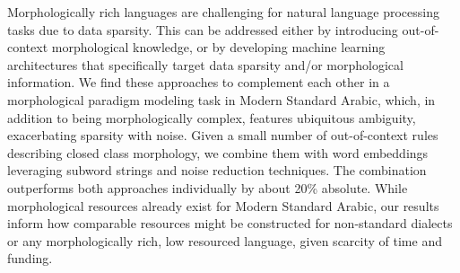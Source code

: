 Morphologically rich languages are challenging for natural language processing tasks due to data sparsity.  This can be addressed either by introducing out-of-context morphological knowledge, or by developing machine learning architectures that specifically target data sparsity and/or morphological information.  We find these approaches to complement each other in a morphological paradigm modeling task in Modern Standard Arabic, which, in addition to being morphologically complex, features ubiquitous ambiguity, exacerbating sparsity with noise.  Given a small number of out-of-context rules describing closed class morphology, we combine them with word embeddings leveraging subword strings and noise reduction techniques.  The combination outperforms both approaches individually by about 20\% absolute.  While morphological resources already exist for Modern Standard Arabic, our results inform how comparable resources might be constructed for non-standard dialects or any morphologically rich, low resourced language, given scarcity of time and funding.
